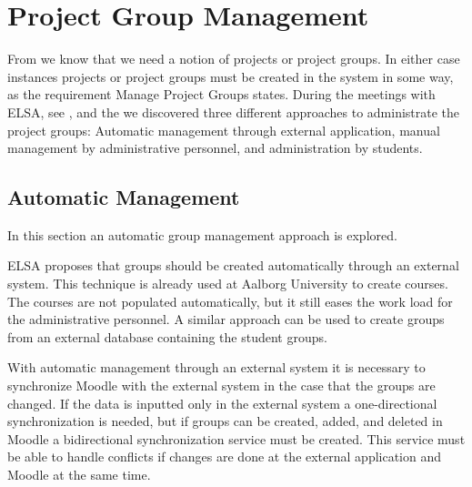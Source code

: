 \section{Project Group Management}
\label{sec:groupManagement}
\label{sec:projectgroupadministration}
From  we know that we need a notion of projects or project groups.
In either case instances projects or project groups must be created in the system in some way, as the requirement Manage Project Groups states. 
During the meetings with ELSA,  see , and the \admpers{} we discovered three different approaches to administrate the project groups: Automatic management through external application, manual management by administrative personnel, and administration by students. 




\subsection{Automatic Management}
\label{sub:automanagement}
In this section an automatic group management approach is explored.  

ELSA proposes that groups should be created automatically through an external system. 
This technique is already used at Aalborg University to create courses. 
The courses are not populated automatically, but it still eases the work load for the administrative personnel.  
A similar approach can be used to create groups from an external database containing the student groups. 

With automatic management through an external system it is necessary to synchronize Moodle with the external system in the case that the groups are changed. 
If the data is inputted only in the external system a one-directional synchronization is needed, but if groups can be created, added, and deleted in Moodle a bidirectional synchronization service must be created. 
This service must be able to handle conflicts if changes are done at the external application and Moodle at the same time.

